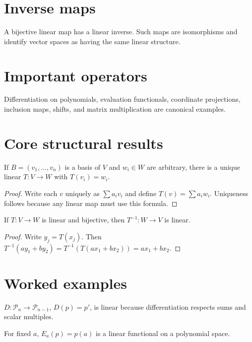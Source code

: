 \section{Inverse maps}
A bijective linear map has a linear inverse. Such maps are isomorphisms and identify vector spaces as having the same linear structure.

\section{Important operators}
Differentiation on polynomials, evaluation functionals, coordinate projections, inclusion maps, shifts, and matrix multiplication are canonical examples.

\section{Core structural results}

\begin{theorem}\label{thm:i05-01}
If $B=(v_1,\ldots,v_n)$ is a basis of $V$ and $w_i\in W$ are arbitrary, there is a unique linear $T:V\to W$ with $T(v_i)=w_i$.
\begin{proof}
Write each $v$ uniquely as $\sum a_i v_i$ and define $T(v)=\sum a_iw_i$. Uniqueness follows because any linear map must use this formula.
\end{proof}
\end{theorem}

\begin{theorem}\label{thm:i05-02}
If $T:V\to W$ is linear and bijective, then $T^{-1}:W\to V$ is linear.
\begin{proof}
Write $y_j=T(x_j)$. Then $T^{-1}(ay_1+by_2)=T^{-1}(T(ax_1+bx_2))=ax_1+bx_2$.
\end{proof}
\end{theorem}

\section{Worked examples}

\begin{example}[Differentiation]\label{ex:i05-worked-01}
$D:\mathcal P_n\to\mathcal P_{n-1}$, $D(p)=p'$, is linear because differentiation respects sums and scalar multiples.
\end{example}

\begin{example}[Evaluation]\label{ex:i05-worked-02}
For fixed $a$, $E_a(p)=p(a)$ is a linear functional on a polynomial space.
\end{example}

